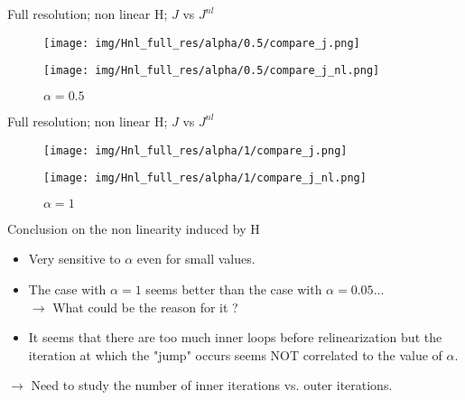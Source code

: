 \documentclass[francais]{beamer}
\begin{document}
\begin{frame}{Full resolution; non linear H; $J$ vs $J^{nl}$}
\begin{center}
\begin{figure}
  \texttt{[image: img/Hnl\_full\_res/alpha/0.5/compare\_j.png]}
  \caption{$\alpha = 0.5$}
\endminipage\hfill
{}
  \texttt{[image: img/Hnl\_full\_res/alpha/0.5/compare\_j\_nl.png]}
  \caption{$\alpha = 0.5$}
\endminipage
\end{figure}
\end{center}
\end{frame}

\begin{frame}{Full resolution; non linear H; $J$ vs $J^{nl}$}
\begin{center}
\begin{figure}
  \texttt{[image: img/Hnl\_full\_res/alpha/1/compare\_j.png]}
  \caption{$\alpha = 1$}
\endminipage\hfill
{}
  \texttt{[image: img/Hnl\_full\_res/alpha/1/compare\_j\_nl.png]}
  \caption{$\alpha = 1$}
\endminipage
\end{figure}
\end{center}
\end{frame}


\begin{frame}{Conclusion on the non linearity induced by H}
 \begin{itemize}
  \item Very sensitive to $\alpha$ even for small values.
  \item The case with $\alpha = 1$ seems better than the case with $\alpha = 0.05$...\\
  $\longrightarrow$ What could be the reason for it ?
  \item It seems that there are too much inner loops before relinearization but the iteration at which the "jump" occurs seems NOT correlated to the value of $\alpha$.
 \end{itemize}
 \vspace{+0.5cm}
$\longrightarrow$ Need to study the number of inner iterations vs. outer iterations.
\end{frame}

\end{document}
